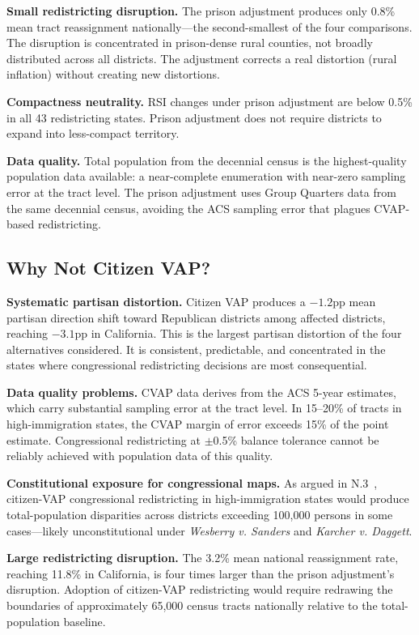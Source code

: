 \textbf{Small redistricting disruption.} The prison adjustment produces only 0.8\% mean tract reassignment nationally---the second-smallest of the four comparisons. The disruption is concentrated in prison-dense rural counties, not broadly distributed across all districts. The adjustment corrects a real distortion (rural inflation) without creating new distortions.

\textbf{Compactness neutrality.} RSI changes under prison adjustment are below 0.5\% in all 43 redistricting states. Prison adjustment does not require districts to expand into less-compact territory.

\textbf{Data quality.} Total population from the decennial census is the highest-quality population data available: a near-complete enumeration with near-zero sampling error at the tract level. The prison adjustment uses Group Quarters data from the same decennial census, avoiding the ACS sampling error that plagues CVAP-based redistricting.

\subsection{Why Not Citizen VAP?}

\textbf{Systematic partisan distortion.} Citizen VAP produces a $-1.2$pp mean partisan direction shift toward Republican districts among affected districts, reaching $-3.1$pp in California. This is the largest partisan distortion of the four alternatives considered. It is consistent, predictable, and concentrated in the states where congressional redistricting decisions are most consequential.

\textbf{Data quality problems.} CVAP data derives from the ACS 5-year estimates, which carry substantial sampling error at the tract level. In 15--20\% of tracts in high-immigration states, the CVAP margin of error exceeds 15\% of the point estimate. Congressional redistricting at $\pm$0.5\% balance tolerance cannot be reliably achieved with population data of this quality.

\textbf{Constitutional exposure for congressional maps.} As argued in N.3~\citep{dellalibera2026n3}, citizen-VAP congressional redistricting in high-immigration states would produce total-population disparities across districts exceeding 100,000 persons in some cases---likely unconstitutional under \emph{Wesberry v. Sanders} and \emph{Karcher v. Daggett}.

\textbf{Large redistricting disruption.} The 3.2\% mean national reassignment rate, reaching 11.8\% in California, is four times larger than the prison adjustment's disruption. Adoption of citizen-VAP redistricting would require redrawing the boundaries of approximately 65,000 census tracts nationally relative to the total-population baseline.

